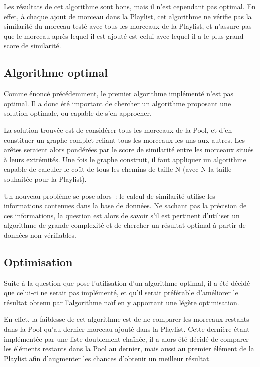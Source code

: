 Les résultats de cet algorithme sont bons, mais il n'est cependant pas optimal.
En effet, à chaque ajout de morceau dans la Playlist, cet algorithme ne vérifie
pas la similarité du morceau testé avec tous les morceaux de la Playlist, et
n'assure pas que le morceau après lequel il est ajouté est celui avec lequel
il a le plus grand score de similarité.


\subsection{Algorithme optimal}
\label{impl:selection:optimal}

Comme énoncé précédemment, le premier algorithme implémenté n'est pas optimal.
Il a donc été important de chercher un algorithme proposant une solution
optimale, ou capable de s'en approcher.\newline

La solution trouvée est de considérer tous les morceaux de la Pool, et d'en
constituer un graphe complet reliant tous les morceaux les uns aux autres. Les
arêtes seraient alors pondérées par le score de similarité entre les morceaux
situés à leurs extrémités. Une fois le graphe construit, il faut appliquer un
algorithme capable de calculer le coût de tous les chemins de taille N (avec N
la taille souhaitée pour la Playlist).\newline

Un nouveau problème se pose alors~: le calcul de similarité utilise les
informations contenues dans la base de données. Ne sachant pas la précision de
ces informations, la question est alors de savoir s'il est pertinent
d'utiliser un algorithme de grande complexité et de chercher un résultat
optimal à partir de données non vérifiables.

\subsection{Optimisation}
\label{impl:selection:optimisation}

Suite à la question que pose l'utilisation d'un algorithme optimal, il a été
décidé que celui-ci ne serait pas implémenté, et qu'il serait préférable
d'améliorer le résultat obtenu par l'algorithme naïf en y apportant une légère
optimisation.\newline

En effet, la faiblesse de cet algorithme est de ne comparer les morceaux
restants dans la Pool qu'au dernier morceau ajouté dans la Playlist. Cette
dernière étant implémentée par une liste doublement chaînée, il a alors été
décidé de comparer les éléments restants dans la Pool au dernier, mais aussi au
premier élément de la Playlist afin d'augmenter les chances d'obtenir un
meilleur résultat.


